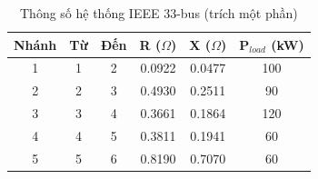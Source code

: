 \begin{table}[H]
\centering
\caption{Thông số hệ thống IEEE 33-bus (trích một phần)}
\label{tab:app-ieee33}
\begin{tabular}{cccccc}
\toprule
\textbf{Nhánh} & \textbf{Từ} & \textbf{Đến} & \textbf{R ($\Omega$)} & \textbf{X ($\Omega$)} & \textbf{P$_{load}$ (kW)} \\
\midrule
1  & 1 & 2  & 0.0922 & 0.0477 & 100 \\
2  & 2 & 3  & 0.4930 & 0.2511 & 90  \\
3  & 3 & 4  & 0.3661 & 0.1864 & 120 \\
4  & 4 & 5  & 0.3811 & 0.1941 & 60  \\
5  & 5 & 6  & 0.8190 & 0.7070 & 60  \\
\bottomrule
\end{tabular}
\end{table}

% 
